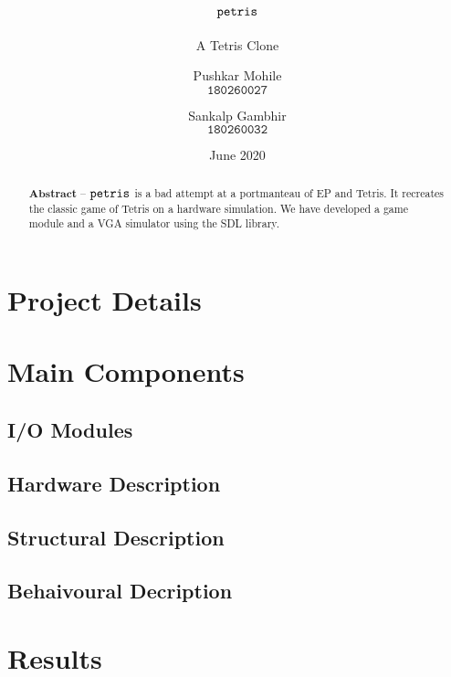\documentclass[10pt, a4paper, egregdoesnotlikesansseriftitles]{scrartcl}
\title{$\texttt{petris}$}
\subtitle{A Tetris Clone}
\author{
    Pushkar Mohile \\
    $\texttt{180260027}$
    \and
    Sankalp Gambhir \\
    $\texttt{180260032}$
    }
\date{June 2020}
\begin{document}
\maketitle

\begin{abstract}
    \centering
    $\textbf{Abstract --}$
    $\texttt{petris}$ is a bad attempt at a portmanteau of 
    EP and Tetris. It recreates the classic game of Tetris on a hardware simulation. We have developed a game module and a VGA simulator using the SDL library. 
\end{abstract}

  
\section{Project Details}


\section{Main Components}
\subsection{I/O Modules}

\subsection{Hardware Description}
\subsection{Structural Description }
\subsection{Behaivoural Decription}


\section{Results}

\end{document}
